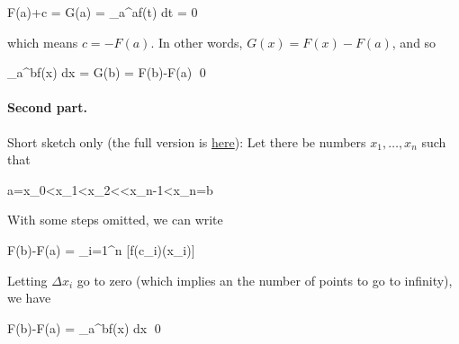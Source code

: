 \bee
F(a)+c = G(a) = \int_{a}^{a}f(t) dt = 0
\eee

which means $c = - F(a)$. In other words, $G(x) = F(x) - F(a)$, and so

\bee
\int_{a}^{b}f(x) dx = G(b) = F(b)-F(a) \qed
\eee

\paragraph{Second part.} Short sketch only (the full version is \href{https://en.wikipedia.org/wiki/Fundamental_theorem_of_calculus}{here}): Let there be numbers $x_1,\ldots,x_n$ such that

\bee
a=x_{0}<x_{1}<x_{2}<\cdots <x_{n-1}<x_{n}=b
\eee

With some steps omitted, we can write

\bee
F(b)-F(a) = \sum_{i=1}^{n} [f(c_{i})(\Delta x_{i})]
\eee

Letting $\Delta x_i$ go to zero (which implies an the number of points to go to infinity), we have

\bee
F(b)-F(a) = \int_{a}^{b}f(x) dx \qed
\eee


